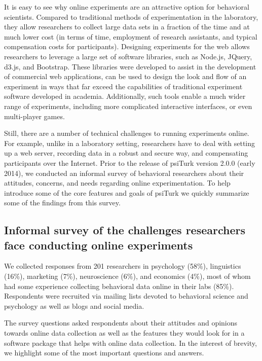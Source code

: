 \documentclass[twocolumn]{svjour3}          %
\newcommand{\psiturk}[0]{\textsf{psiTurk}}
\begin{document}
It is easy to see why online experiments are an attractive option for behavioral 
scientists.  Compared to traditional methods of experimentation in the laboratory,
they allow researchers to collect large data sets in a fraction of the time and at 
much lower cost (in terms of time, employment of research assistants, and typical 
compensation costs for participants).  Designing experiments for the web allows 
researchers to leverage a large set of software libraries, such as Node.js, JQuery, d3.js, 
and Bootstrap. These libraries were developed to assist 
in the development of commercial web applications, can be used to design the look and flow of an 
experiment in ways 
that far exceed the capabilities of traditional experiment software developed 
in academia.  Additionally, such tools enable a much wider range of experiments, 
including more complicated interactive interfaces, or even multi-player games.

Still, there are a number of technical challenges to running experiments online.
For example, unlike in a laboratory setting, researchers have to 
deal with setting up a web server, recording data in a robust and secure way, 
and compensating participants over the Internet.  
Prior to the release of \psiturk{} version
2.0.0 (early 2014), we conducted an informal survey of behavioral researchers 
about their attitudes, concerns, and needs regarding online experimentation. 
To help introduce some of the core features and goals of \psiturk{} we 
quickly summarize some of the findings from this survey.



\subsection{Informal survey of the challenges researchers face conducting online experiments}
 We collected responses from 201 researchers in psychology (58\%),
linguistics (16\%), marketing (7\%), neuroscience (6\%), and economics (4\%), most of 
whom had some experience collecting behavioral data online in their labs (85\%).  
Respondents were recruited via mailing lists devoted to behavioral science and psychology 
as well as blogs and social media. 

The survey questions asked respondents about their attitudes and opinions towards
online data collection as well as the features they would look for in a software package
that helps with online data collection.  In the interest of brevity, we highlight some of the
most important questions and answers.
\end{document}

